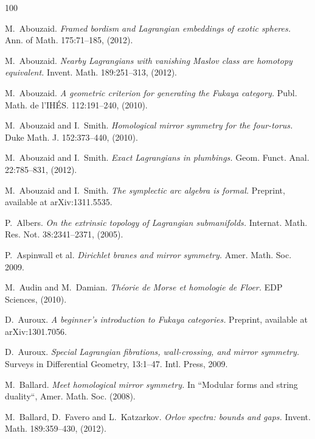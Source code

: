 \begin{thebibliography}{100}

M.~Abouzaid.
\emph{Framed bordism and Lagrangian embeddings of exotic spheres.}
Ann. of Math. 175:71--185, (2012).

M.~Abouzaid.
\emph{Nearby Lagrangians with vanishing Maslov class are homotopy equivalent.}
Invent. Math. 189:251--313, (2012).

M.~Abouzaid.
\emph{A geometric criterion for generating the Fukaya category.}
Publ. Math. de l'IH\'ES. 112:191--240, (2010).

M.~Abouzaid and I.~Smith.
\emph{Homological mirror symmetry for the four-torus.}
Duke Math. J. 152:373--440, (2010).

M.~Abouzaid and I.~Smith.
\emph{Exact Lagrangians in plumbings.}
Geom. Funct. Anal. 22:785--831, (2012).

M.~Abouzaid and I.~Smith.
\emph{The symplectic arc algebra is formal.}
Preprint, available at arXiv:1311.5535.

P.~Albers.
\emph{On the extrinsic topology of Lagrangian submanifolds.}
Internat. Math. Res. Not. 38:2341--2371, (2005).

P.~Aspinwall et al.
\emph{Dirichlet branes and mirror symmetry.}
Amer. Math. Soc. 2009.

M.~Audin and M.~Damian.
\emph{Th\'eorie de Morse et homologie de Floer.}
EDP Sciences, (2010).

D.~Auroux.
\emph{A beginner's introduction to Fukaya categories.}
Preprint, available at arXiv:1301.7056.

D.~Auroux.
\emph{Special Lagrangian fibrations, wall-crossing, and mirror symmetry.}
Surveys in Differential Geometry, 13:1--47. Intl. Press, 2009.

M.~Ballard.
\emph{Meet homological mirror symmetry.}
In ``Modular forms and string duality“, Amer. Math. Soc. (2008).

M.~Ballard, D.~Favero and L.~Katzarkov.
\emph{Orlov spectra: bounds and gaps.}
Invent. Math. 189:359--430, (2012).


\end{thebibliography}
